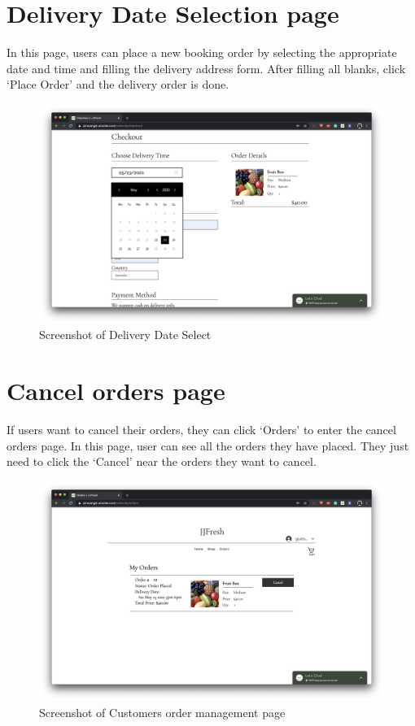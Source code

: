 \clearpage
\section*{Delivery Date Selection page}
In this page, users can place a new booking order by selecting the appropriate date and time and filling the delivery address form. After filling all blanks, click ‘Place Order’ and the delivery order is done.
\begin{figure}[htp]
\centering
\includegraphics[width=\textwidth]{Figures/dateSelect.png}
\caption{Screenshot of Delivery Date Select}
\label{fig:dateSelect}
\end{figure}

\clearpage
\section*{Cancel orders page}
If users want to cancel their orders, they can click ‘Orders’ to enter the cancel orders page. In this page, user can see all the orders they have placed. They just need to click the ‘Cancel’ near the orders they want to cancel.
\begin{figure}[htp]
\centering
\includegraphics[width=\textwidth]{Figures/customerOrder.png}
\caption{Screenshot of Customers order management page}
\label{fig:customerOrder}
\end{figure}

